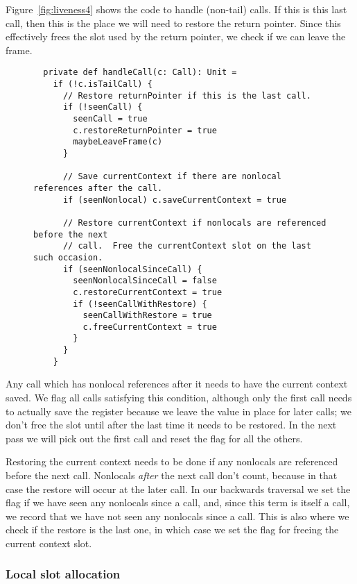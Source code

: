 Figure~\ref{fig:liveness4} shows the code to handle (non-tail) calls.
If this is this last call,
then this is the place we will need to restore the return pointer.
Since this effectively frees the slot used by the return pointer,
we check if we can leave the frame.

\begin{figure}
\begin{verbatim}
  private def handleCall(c: Call): Unit =
    if (!c.isTailCall) {
      // Restore returnPointer if this is the last call.
      if (!seenCall) {
        seenCall = true
        c.restoreReturnPointer = true
        maybeLeaveFrame(c)
      }

      // Save currentContext if there are nonlocal references after the call.
      if (seenNonlocal) c.saveCurrentContext = true

      // Restore currentContext if nonlocals are referenced before the next
      // call.  Free the currentContext slot on the last such occasion.
      if (seenNonlocalSinceCall) {
        seenNonlocalSinceCall = false
        c.restoreCurrentContext = true
        if (!seenCallWithRestore) {
          seenCallWithRestore = true
          c.freeCurrentContext = true
        }
      }
    }
\end{verbatim}
\getcaption
\end{figure}

Any call which has nonlocal references after it needs to have the
current context saved.
We flag all calls satisfying this condition,
although only the first call needs to actually save the register
because we leave the value in place for later calls;
we don't free the slot until after the last time it needs to be restored.
In the next pass we will pick out the first call
and reset the flag for all the others.

Restoring the current context needs to be done
if any nonlocals are referenced before the next call.
Nonlocals \emph{after} the next call don't count,
because in that case the restore will occur at the later call.
In our backwards traversal we set the flag if
we have seen any nonlocals since a call,
and, since this term is itself a call,
we record that we have not seen any nonlocals since a call.
This is also where we check if the restore is the last one,
in which case we set the flag for freeing the current context slot.


\subsubsection{Local slot allocation\label{sec:locals}}

